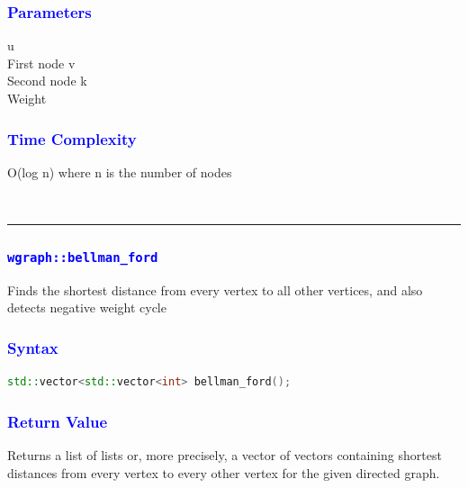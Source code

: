 \documentclass[11pt,a4paper]{article}
\begin{document}
\subsubsection*{\textcolor{blue}{ \large {Parameters}}}
u\\
First node
v\\
Second node
k\\
Weight

\subsubsection*{\textcolor{blue}{ \large {Time Complexity}}}
O(log n) where n is the number of nodes



\\
\rule{17cm}{0.1mm}

\subsubsection*{\textcolor{blue}{\Large\texttt{wgraph::bellman\_ford}}}
Finds the shortest distance from every vertex to all other vertices, and also detects negative weight cycle


\subsubsection*{\textcolor{blue}{ \large {Syntax}}}
\begin{lstlisting}[language=C++]
std::vector<std::vector<int> bellman_ford();

\end{lstlisting}

\subsubsection*{\textcolor{blue}{ \large {Return Value}}}
Returns a list of lists or, more precisely, a vector of vectors containing shortest distances from every vertex to every other vertex for the given directed graph.
\end{document}

